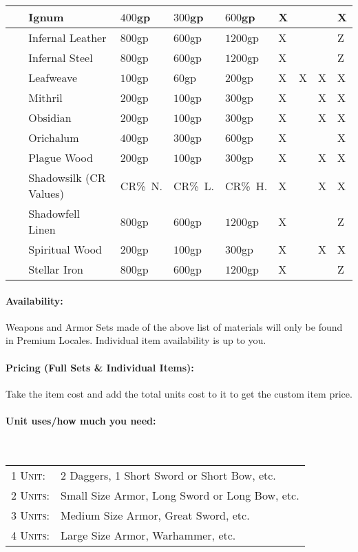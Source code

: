 \documentclass[a5paper,8pt]{book}
\begin{document}
\begin{tabularx}{\textwidth}{|p{0.1cm}lZZZYYYY|}
    ~ & Ignum & $400$gp & $300$gp & $600$gp                             & X & ~ & ~ & X \\\hline
    ~ & Infernal Leather & $800$gp & $600$gp & $1200$gp                 & X & ~ & ~ & Z \\\hline
    ~ & Infernal Steel & $800$gp & $600$gp & $1200$gp                   & X & ~ & ~ & Z \\\hline
    ~ & Leafweave & $100$gp & $60$gp & $200$gp                          & X & X & X & X \\\hline
    ~ & Mithril & $200$gp & $100$gp & $300$gp                           & X & ~ & X & X \\\hline
    ~ & Obsidian & $200$gp & $100$gp & $300$gp                          & X & ~ & X & X \\\hline
    ~ & Orichalum & $400$gp & $300$gp & $600$gp                         & X & ~ & ~ & X \\\hline
    ~ & Plague Wood & $200$gp & $100$gp & $300$gp                       & X & ~ & X & X \\\hline
    ~ & Shadowsilk (CR Values) & CR\%~N. & CR\%~L. & CR\%~H.      & X & ~ & X & X \\\hline
    ~ & Shadowfell Linen & $800$gp & $600$gp & $1200$gp                 & X & ~ & ~ & Z \\\hline
    ~ & Spiritual Wood & $200$gp & $100$gp & $300$gp                    & X & ~ & X & X \\\hline
    ~ & Stellar Iron & $800$gp & $600$gp & $1200$gp                     & X & ~ & ~ & Z \\\hline
\end{tabularx}

\paragraph{Availability:}
Weapons and Armor Sets made of the above list of materials will only be found in Premium Locales. Individual item availability is up to you.

\paragraph{Pricing (Full Sets \& Individual Items):}
Take the item cost and add the total units cost to it to get the custom item price.

\newpage

\paragraph{Unit uses/how much you need:}
~
\begin{tabularx}{0.7\textwidth}{ll}
    \textsc{1 Unit:}  & 2 Daggers, 1 Short Sword or Short Bow, etc.\\
    \textsc{2 Units:} & Small Size Armor, Long Sword or Long Bow, etc.\\
    \textsc{3 Units:} & Medium Size Armor, Great Sword, etc.\\
    \textsc{4 Units:} & Large Size Armor, Warhammer, etc.\\
\end{tabularx}
\end{document}
